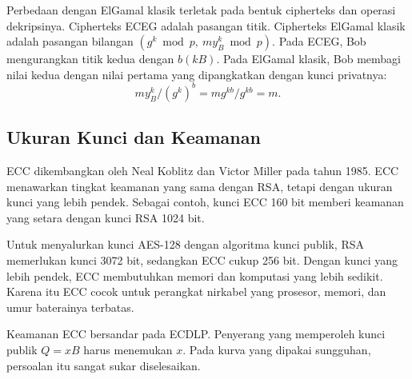 Perbedaan dengan ElGamal klasik terletak pada bentuk cipherteks dan operasi
dekripsinya. Cipherteks ECEG adalah pasangan titik. Cipherteks ElGamal klasik
adalah pasangan bilangan $(g^k \bmod p,\ m y_B^k \bmod p)$. Pada ECEG, Bob
mengurangkan titik kedua dengan $b(kB)$. Pada ElGamal klasik, Bob membagi nilai
kedua dengan nilai pertama yang dipangkatkan dengan kunci privatnya:
\[
m y_B^k / (g^k)^b = m g^{kb} / g^{kb} = m .
\]

\subsection{Ukuran Kunci dan Keamanan}
\label{subsec:ecc-vs-rsa}
\label{subsec:mengapa-ecdlp-sukar}

ECC dikembangkan oleh Neal Koblitz dan Victor Miller pada tahun 1985. ECC
menawarkan tingkat keamanan yang sama dengan RSA, tetapi dengan ukuran kunci
yang lebih pendek. Sebagai contoh, kunci ECC 160 bit memberi keamanan yang
setara dengan kunci RSA 1024 bit.

Untuk menyalurkan kunci AES-128 dengan algoritma kunci publik, RSA memerlukan
kunci 3072 bit, sedangkan ECC cukup 256 bit. Dengan kunci yang lebih pendek,
ECC membutuhkan memori dan komputasi yang lebih sedikit. Karena itu ECC cocok
untuk perangkat nirkabel yang prosesor, memori, dan umur baterainya terbatas.

Keamanan ECC bersandar pada ECDLP. Penyerang yang memperoleh kunci publik
$Q = xB$ harus menemukan $x$. Pada kurva yang dipakai sungguhan, persoalan itu
sangat sukar diselesaikan.

